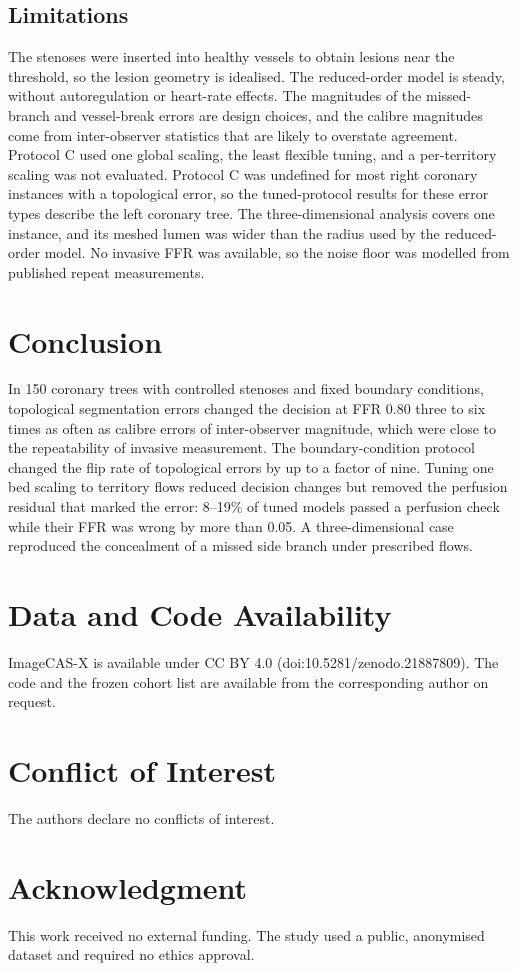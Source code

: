 \documentclass[journal]{IEEEtran}
\begin{document}
\subsection{Limitations}
The stenoses were inserted into healthy vessels to obtain lesions near the threshold, so the lesion geometry is
idealised. The reduced-order model is steady, without autoregulation or heart-rate effects. The magnitudes of the
missed-branch and vessel-break errors are design choices, and the calibre magnitudes come from inter-observer
statistics that are likely to overstate agreement. Protocol C used one global scaling, the least flexible tuning, and
a per-territory scaling was not evaluated. Protocol C was undefined for most right coronary instances with a
topological error, so the tuned-protocol results for these error types describe the left coronary tree. The
three-dimensional analysis covers one instance, and its meshed lumen was wider than the radius used by the
reduced-order model. No invasive FFR was available, so the noise floor was modelled from published repeat
measurements.

\section{Conclusion}
In 150 coronary trees with controlled stenoses and fixed boundary conditions, topological segmentation errors
changed the decision at FFR 0.80 three to six times as often as calibre errors of inter-observer magnitude, which
were close to the repeatability of invasive measurement. The boundary-condition protocol changed the flip rate of
topological errors by up to a factor of nine. Tuning one bed scaling to territory flows reduced decision changes
but removed the perfusion residual that marked the error: 8--19\% of tuned models passed a perfusion check while
their FFR was wrong by more than 0.05. A three-dimensional case reproduced the concealment of a missed side branch
under prescribed flows.

\section*{Data and Code Availability}
ImageCAS-X is available under CC BY 4.0 (doi:10.5281/zenodo.21887809). The code and the frozen cohort list are
available from the corresponding author on request.

\section*{Conflict of Interest}
The authors declare no conflicts of interest.

\section*{Acknowledgment}
This work received no external funding. The study used a public, anonymised dataset and required no ethics
approval.



\end{document}
